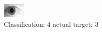 \begin{figure}[h!]
\begin{center}
\includegraphics[width=0.60\columnwidth]{figures/ID1871_class_4_target_3.png}
\end{center}
\caption{ Classification: 4 actual target: 3}
\label{fig:ID1871_class_4_target_3}
\end{figure}
